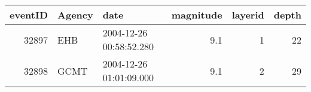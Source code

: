 \begin{tabular}{rllrrr}
\toprule
 eventID & Agency &                    date &  magnitude &  layerid &  depth \\
\midrule
   32897 &    EHB & 2004-12-26 00:58:52.280 &        9.1 &        1 &     22 \\
   32898 &   GCMT & 2004-12-26 01:01:09.000 &        9.1 &        2 &     29 \\
\bottomrule
\end{tabular}
